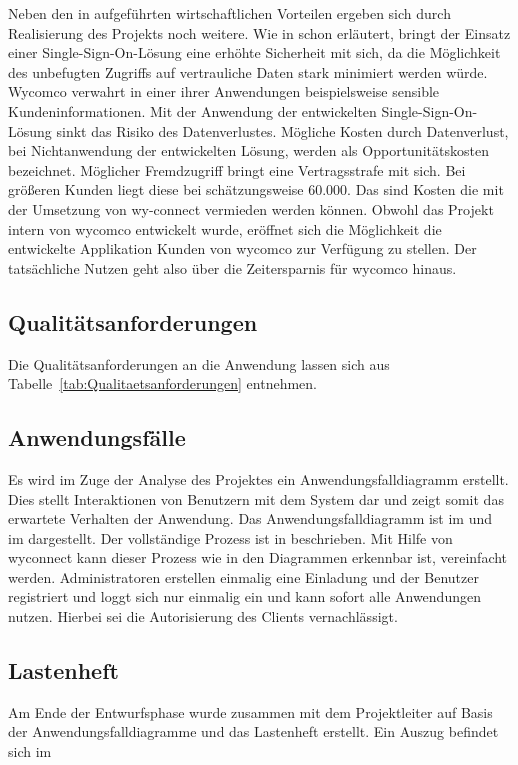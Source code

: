 Neben den in  aufgeführten wirtschaftlichen Vorteilen ergeben sich durch Realisierung des Projekts noch weitere.
Wie in  schon erläutert, bringt der Einsatz einer Single-Sign-On-Lösung eine erhöhte Sicherheit mit sich, da die Möglichkeit des unbefugten Zugriffs auf vertrauliche Daten stark minimiert werden würde. Wycomco verwahrt in einer ihrer Anwendungen beispielsweise sensible Kundeninformationen. Mit der Anwendung der entwickelten Single-Sign-On-Lösung sinkt das Risiko des Datenverlustes. Mögliche Kosten durch Datenverlust, bei Nichtanwendung der entwickelten Lösung, werden als  Opportunitätskosten bezeichnet. Möglicher Fremdzugriff bringt eine Vertragsstrafe mit sich. Bei größeren Kunden liegt diese bei schätzungsweise 60.000\eur{}. Das sind Kosten die mit der Umsetzung von wy-connect vermieden werden können. 
Obwohl das Projekt intern von wycomco entwickelt wurde, eröffnet sich die Möglichkeit die entwickelte Applikation  Kunden von wycomco zur Verfügung zu stellen. Der tatsächliche Nutzen geht also über die Zeitersparnis für wycomco hinaus.

\subsection{Qualitätsanforderungen}
\label{sec:Qualitaetsanforderungen}

Die Qualitätsanforderungen an die Anwendung lassen sich aus Tabelle~\ref{tab:Qualitaetsanforderungen} entnehmen.

\subsection{Anwendungsfälle}
\label{sec:Anwendungsfaelle}

Es wird im Zuge der Analyse des Projektes ein Anwendungsfalldiagramm erstellt. Dies stellt Interaktionen von Benutzern mit dem System dar und zeigt somit das erwartete Verhalten der Anwendung. Das Anwendungsfalldiagramm ist im  und im  dargestellt.
Der vollständige Prozess ist in  beschrieben.
Mit Hilfe von wyconnect kann dieser Prozess wie in den Diagrammen erkennbar ist, vereinfacht werden. Administratoren erstellen einmalig eine Einladung und der Benutzer registriert und loggt sich nur einmalig ein und kann sofort alle Anwendungen nutzen. Hierbei sei die Autorisierung des Clients vernachlässigt. 

\subsection{Lastenheft}
\label{sec:Lastenheft}
Am Ende der Entwurfsphase wurde zusammen mit dem Projektleiter auf Basis der Anwendungsfalldiagramme  und  das Lastenheft erstellt. Ein Auszug befindet sich im 
